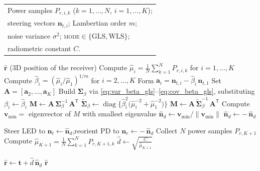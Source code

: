 \documentclass[journal]{IEEEtran}
\begin{document}
\begin{algorithm}[tb]
  \caption{3D Position Estimation from $K$ Orientations}
  \label{alg:position}
  \small
  \begin{algorithmic}[1]
  \Require
    \begin{tabular}[t]{@{}l@{}}
      Power samples $P_{r,i,k}$ ($k=1,\dots,N$, $i=1,\dots,K$);\\
      steering vectors $\mathbf n_{t,i}$; Lambertian order $m$;\\
      noise variance $\sigma^{2}$; \textsc{mode}$\in\{\mathrm{GLS},\mathrm{WLS}\}$;\\
      radiometric constant $C$.
    \end{tabular}
  \Ensure
    $\hat{\mathbf r}$ (3D position of the receiver)
  \Statex
  \State \quad Compute $\hat\mu_i=\tfrac{1}{N}\sum_{k=1}^N P_{r,i,k}$
            for $i=1,\dots,K$
  \State \quad Compute $\hat\beta_i=(\hat\mu_i/\hat\mu_1)^{1/m}$ for $i=2,\dots,K$
  \State \quad Form $\mathbf a_i = \mathbf n_{t,i} - \hat\beta_i\,\mathbf n_{t,1}$
  \State \quad Set $\mathbf A = [\mathbf a_2,\dots,\mathbf a_K]$
    \State \quad Build $\mathbf\Sigma_\beta$ via
           \eqref{eq:var_beta_gls}--\eqref{eq:cov_beta_gls},
           substituting $\beta_i \leftarrow \hat\beta_i$
    \State \quad $\mathbf M \gets \mathbf A\,\mathbf\Sigma_\beta^{-1}\,\mathbf A^{\mathsf T}$
  \Else{}
    \State \quad $\mathbf{\tilde\Sigma}_\beta \gets 
           \operatorname{diag}\bigl\{\hat\beta_i^{2}\bigl(\hat\mu_i^{-2}+\hat\mu_1^{-2}\bigr)\bigr\}$
    \State \quad $\mathbf M \gets \mathbf A\,\mathbf{\tilde\Sigma}_\beta^{-1}\,\mathbf A^{\mathsf T}$
  \EndIf
  \State \quad Compute $\mathbf v_{\min} =$ eigenvector of $M$ with smallest eigenvalue
  \State \quad $\hat{\mathbf n}_d \gets \mathbf v_{\min}/\|\mathbf v_{\min}\|$
    \State \quad $\hat{\mathbf n}_d \gets -\,\hat{\mathbf n}_d$ 
  \EndIf

  \Statex
  \State \quad Steer LED to $\mathbf n_t \gets \hat{\mathbf n}_d$,\quad reorient PD to $\mathbf n_r \gets -\,\hat{\mathbf n}_d$
  \State \quad Collect $N$ power samples $P_{r,K+1}$ 
  \State \quad Compute $\hat\mu_{K+1} = \tfrac{1}{N}\sum_{k=1}^{N} P_{r,K+1,k}$
  \State \quad $\hat d \gets \sqrt{\tfrac{C}{\hat\mu_{K+1}}}$

  \Statex
  \State \quad $\hat{\mathbf r} \gets \mathbf t + \hat d \,\hat{\mathbf n}_d$
  \State \Return $\hat{\mathbf r}$
  \end{algorithmic}
\end{algorithm}
\end{document}

